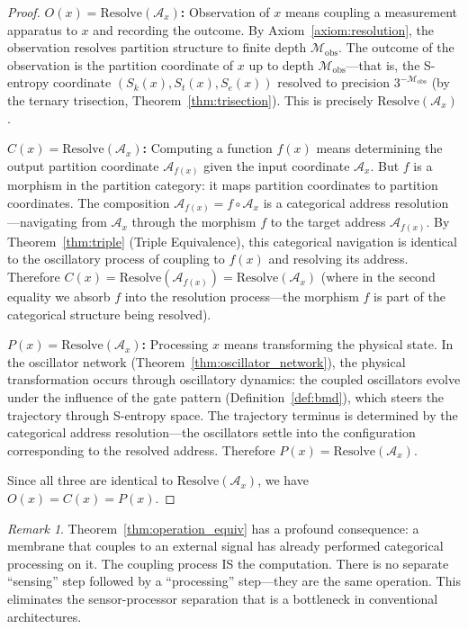 \documentclass[twocolumn,10pt]{article}
\theoremstyle{remark}
\newtheorem{remark}[theorem]{Remark}
\newcommand{\Depth}{\mathcal{M}}
\newcommand{\Sk}{S_k}
\newcommand{\St}{S_t}
\newcommand{\Se}{S_e}
\begin{document}
\begin{proof}
\textbf{$O(x) = \mathrm{Resolve}(\mathcal{A}_x)$:} Observation of $x$ means coupling a measurement apparatus to $x$ and recording the outcome. By Axiom~\ref{axiom:resolution}, the observation resolves partition structure to finite depth $\Depth_{\mathrm{obs}}$. The outcome of the observation is the partition coordinate of $x$ up to depth $\Depth_{\mathrm{obs}}$---that is, the S-entropy coordinate $(\Sk(x), \St(x), \Se(x))$ resolved to precision $3^{-\Depth_{\mathrm{obs}}}$ (by the ternary trisection, Theorem~\ref{thm:trisection}). This is precisely $\mathrm{Resolve}(\mathcal{A}_x)$.

\textbf{$C(x) = \mathrm{Resolve}(\mathcal{A}_x)$:} Computing a function $f(x)$ means determining the output partition coordinate $\mathcal{A}_{f(x)}$ given the input coordinate $\mathcal{A}_x$. But $f$ is a morphism in the partition category: it maps partition coordinates to partition coordinates. The composition $\mathcal{A}_{f(x)} = f \circ \mathcal{A}_x$ is a categorical address resolution---navigating from $\mathcal{A}_x$ through the morphism $f$ to the target address $\mathcal{A}_{f(x)}$. By Theorem~\ref{thm:triple} (Triple Equivalence), this categorical navigation is identical to the oscillatory process of coupling to $f(x)$ and resolving its address. Therefore $C(x) = \mathrm{Resolve}(\mathcal{A}_{f(x)}) = \mathrm{Resolve}(\mathcal{A}_x)$ (where in the second equality we absorb $f$ into the resolution process---the morphism $f$ is part of the categorical structure being resolved).

\textbf{$P(x) = \mathrm{Resolve}(\mathcal{A}_x)$:} Processing $x$ means transforming the physical state. In the oscillator network (Theorem~\ref{thm:oscillator_network}), the physical transformation occurs through oscillatory dynamics: the coupled oscillators evolve under the influence of the gate pattern (Definition~\ref{def:bmd}), which steers the trajectory through S-entropy space. The trajectory terminus is determined by the categorical address resolution---the oscillators settle into the configuration corresponding to the resolved address. Therefore $P(x) = \mathrm{Resolve}(\mathcal{A}_x)$.

Since all three are identical to $\mathrm{Resolve}(\mathcal{A}_x)$, we have $O(x) = C(x) = P(x)$.
\end{proof}

\begin{remark}
Theorem~\ref{thm:operation_equiv} has a profound consequence: a membrane that couples to an external signal has already performed categorical processing on it. The coupling process IS the computation. There is no separate ``sensing'' step followed by a ``processing'' step---they are the same operation. This eliminates the sensor-processor separation that is a bottleneck in conventional architectures.
\end{remark}
\end{document}
